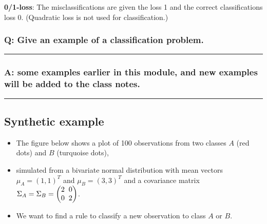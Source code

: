 \documentclass[]{article}
\providecommand{\tightlist}{%
  \setlength{\itemsep}{0pt}\setlength{\parskip}{0pt}}
\begin{document}
\textbf{0/1-loss}: The misclassifications are given the loss 1 and the
correct classifications loss 0. (Quadratic loss is not used for
classification.)

\hypertarget{q-give-an-example-of-a-classification-problem.}{%
\subsubsection{Q: Give an example of a classification
problem.}\label{q-give-an-example-of-a-classification-problem.}}

\begin{center}\rule{0.5\linewidth}{\linethickness}\end{center}

\hypertarget{a-some-examples-earlier-in-this-module-and-new-examples-will-be-added-to-the-class-notes.}{%
\subsubsection{A: some examples earlier in this module, and new examples
will be added to the class
notes.}\label{a-some-examples-earlier-in-this-module-and-new-examples-will-be-added-to-the-class-notes.}}

\begin{center}\rule{0.5\linewidth}{\linethickness}\end{center}

\hypertarget{synthetic-example}{%
\subsection{Synthetic example}\label{synthetic-example}}

\begin{itemize}
\tightlist
\item
  The figure below shows a plot of 100 observations from two classes
  \(A\) (red dots) and \(B\) (turquoise dots),
\item
  simulated from a bivariate normal distribution with mean vectors
  \(\mu_A = (1, 1)^T\) and \(\mu_B = (3, 3)^T\) and a covariance matrix
  \(\Sigma_A = \Sigma_B = \begin{pmatrix} 2\hspace{2mm} 0 \\ 0 \hspace{2mm} 2 \end{pmatrix}\).
\item
  We want to find a rule to classify a new observation to class \(A\) or
  \(B\).
\end{itemize}
\end{document}
